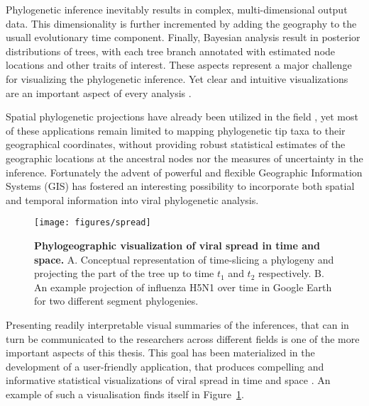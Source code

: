 Phylogenetic inference inevitably results in complex, multi-dimensional output data.
This dimensionality is further incremented by adding the geography to the usuall evolutionary time component.
Finally, Bayesian analysis result in posterior distributions of trees, with each tree branch annotated with estimated node locations and other traits of interest.
These aspects represent a major challenge for visualizing the phylogenetic inference.
Yet clear and intuitive visualizations are an important aspect of every analysis \citep{Hadley2010}.

Spatial phylogenetic projections have already been utilized in the field \citep{Kidd2006,Parks2009}, yet most of these applications remain limited to mapping phylogenetic tip taxa to their geographical coordinates, without providing robust statistical estimates of the geographic locations at the ancestral nodes nor the measures of uncertainty in the inference.
Fortunately the advent of powerful and flexible Geographic Information Systems (GIS) has fostered an interesting possibility to incorporate both spatial and temporal information into viral phylogenetic analysis.

\begin{figure}[H]
\centering
\texttt{[image: figures/spread]}
\caption{
{ \footnotesize 
{\bf Phylogeographic visualization of viral spread in time and space.} 
A. Conceptual representation of time-slicing a phylogeny and projecting the part of the tree up to time $t_{1}$ and $t_{2}$ respectively. B. An example projection of influenza H5N1 over time in Google Earth for two different segment phylogenies. %
} %
}
\label{fig:spread}
\end{figure}

Presenting readily interpretable visual summaries of the inferences, that can in turn be communicated to the researchers across different fields is one of the more important aspects of this thesis.
This goal has been materialized in the development of a user-friendly application, that produces compelling and informative statistical visualizations of viral spread in time and space \citep{Bielejec2011}.
An example of such a visualisation finds itself in Figure~\ref{fig:spread}.

